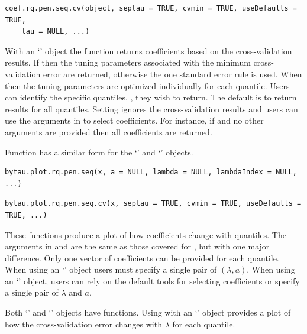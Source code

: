 \begin{verbatim}
coef.rq.pen.seq.cv(object, septau = TRUE, cvmin = TRUE, useDefaults = TRUE,
    tau = NULL, ...)
\end{verbatim}

With an `' object the  function returns coefficients based on the cross-validation results. If  then the tuning parameters associated with the minimum cross-validation error are returned, otherwise the one standard error rule is used. When  then the tuning parameters are optimized individually for each quantile. Users can identify the specific quantiles, , they wish to return. The default is to return results for all quantiles. Setting  ignores the cross-validation results and users can use the arguments in  to select coefficients. For instance, if  and no other arguments are provided then all coefficients are returned.

Function  has a similar form for the `' and `' objects. \newline

\begin{verbatim}
bytau.plot.rq.pen.seq(x, a = NULL, lambda = NULL, lambdaIndex = NULL, ...)
\end{verbatim}

\begin{verbatim}
bytau.plot.rq.pen.seq.cv(x, septau = TRUE, cvmin = TRUE, useDefaults = TRUE, ...)
\end{verbatim}

These functions produce a plot of how coefficients change with quantiles. The arguments in  and  are the same as those covered for , but with one major difference. Only one vector of coefficients can be provided for each quantile. When using an `' object users must specify a single pair of \((\lambda,a)\). When using an `' object, users can rely on the default tools for selecting coefficients or specify a single pair of \(\lambda\) and \(a\).

Both `' and `' objects have  functions. Using  with an `' object provides a plot of how the cross-validation error changes with \(\lambda\) for each quantile.

